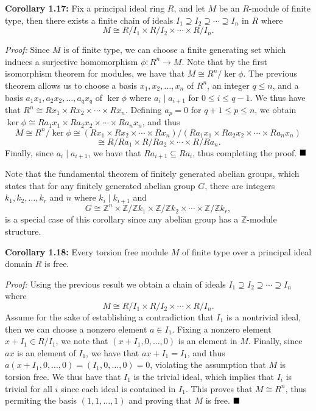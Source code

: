 \documentclass[12pt]{article}
\newcommand{\Z}{\ensuremath{\mathbb{Z}}}
\newcommand{\proof}{\textit{Proof: }}
\newcommand{\done}{\ensuremath{\strut\hfill\blacksquare}}
\begin{document}
\textbf{Corollary 1.17:}
Fix a principal ideal ring \( R \), and let \( M \) be an \( R \)-module of
finite type, then there exists a finite chain of ideals
\( I_1 \supseteq I_2 \supseteq \cdots \supseteq I_n \) in \( R \) where
\[
	M
	\cong R/I_1 \times R/I_2 \times \cdots \times R/I_n.
\]

\proof
Since \( M \) is of finite type, we can choose a finite generating set which
induces a surjective homomorphism \( \phi : R^n \to M \).
Note that by the first isomorphism theorem for modules, we have that
\( M \cong R^n/\ker\phi \).
The previous theorem allows us to choose a basis \( x_1, x_2, \dots, x_n \)
of \( R^n \), an integer \( q \leq n \), and a basis
\( a_1x_1, a_2x_2, \dots, a_qx_q \) of \( \ker\phi \) where
\( a_i \mid a_{i + 1} \) for \( 0 \leq i \leq q - 1 \).
We thus have that \( R^n \cong Rx_1 \times Rx_2 \times \cdots \times Rx_n \).
Defining \( a_p = 0 \) for \( q + 1 \leq p \leq n \), we obtain
\( \ker\phi \cong Ra_1x_1 \times Ra_2x_2 \times \cdots \times Ra_nx_n \),
and thus
\[
	M
	\cong R^n/\ker\phi
	\cong (Rx_1 \times Rx_2 \times \cdots \times Rx_n)
	/ (Ra_1x_1 \times Ra_2x_2 \times \cdots \times Ra_nx_n)
\]
\[
	\cong R/Ra_1 \times R/Ra_2 \times \cdots \times R/Ra_n.
\]
Finally, since \( a_i \mid a_{i + 1} \), we have that
\( Ra_{i + 1} \subseteq Ra_i \), thus completing the proof.
\done

Note that the fundamental theorem of finitely generated abelian groups,
which states that for any finitely generated abelian group \( G \), there are
integers \( k_1, k_2, \dots, k_r \) and \( n \) where \( k_i \mid k_{i + 1} \)
and
\[
	G
	\cong \Z^n
	\times \Z/\Z k_1 \times \Z/\Z k_2 \times \cdots \times \Z/\Z k_r,
\]
is a
special case of this corollary since any abelian group has a \( \Z \)-module
structure.

\textbf{Corollary 1.18:}
Every torsion free module \( M \) of finite type over a principal ideal domain
\( R \) is free.

\proof
Using the previous result we obtain a chain of ideals
\( I_1 \supseteq I_2 \supseteq \cdots \supseteq I_n \) where
\[
	M \cong R/I_1 \times R/I_2 \times \cdots \times R/I_n.
\]
Assume for the sake of establishing a contradiction that \( I_1 \) is a
nontrivial ideal, then we can choose a nonzero element \( a \in I_1 \).
Fixing a nonzero element \( x + I_1 \in R/I_1 \), we note that
\( (x + I_1, 0, \dots, 0) \) is an element in \( M \).
Finally, since \( ax \) is an element of \( I_1 \), we have that
\( ax + I_1 = I_1 \), and thus
\( a(x + I_1, 0, \dots, 0) = (I_1, 0, \dots, 0) = 0 \),
violating the assumption that \( M \) is torsion free.
We thus have that \( I_1 \) is the trivial ideal, which implies that
\( I_i \) is trivial for all \( i \) since each ideal is contained in
\( I_1 \).
This proves that \( M \cong R^n \), thus permiting the basis
\( (1, 1, \dots, 1) \) and proving that \( M \) is free.
\done
\end{document}
